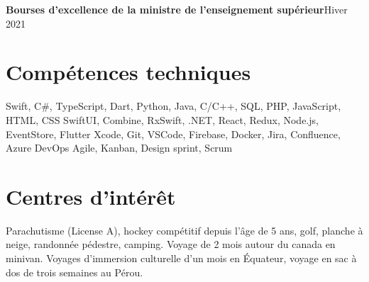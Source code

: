 \documentclass[letterpaper,11pt]{article}
\begin{document}
\resumeProjectHeading
{\textbf{{Bourses d’excellence de la ministre de l’enseignement sup\'erieur}}}{Hiver 2021}
\resumeItemListStart
{}
\resumeItemListEnd

\resumeSubHeadingListEnd

\vspace{1pt}
\section{Comp\'etences techniques}
\resumeSubHeadingListStart

{Swift, C\#, TypeScript, Dart, Python, Java, C/C++, SQL, PHP, JavaScript, HTML, CSS}
{SwiftUI, Combine, RxSwift, .NET, React, Redux, Node.js, EventStore, Flutter}
{Xcode, Git, VSCode, Firebase, Docker, Jira, Confluence, Azure DevOps} 
{Agile, Kanban, Design sprint, Scrum}
\resumeSubHeadingListEnd


\vspace{1pt}
\section{Centres d'int\'er\^et}
\resumeSubHeadingListStart
{}
{Parachutisme (License A), hockey comp\'etitif depuis l'\^age de 5 ans, golf, planche \`a neige, randonn\'ee p\'edestre, camping.}
{Voyage de 2 mois autour du canada en minivan. Voyages d'immersion culturelle d'un mois en \'Equateur, voyage en sac \`a dos de trois semaines au P\'erou.}
\resumeSubHeadingListEnd
\end{document}
